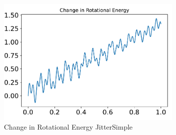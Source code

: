 \begin{figure}[htbp]\centerline{\includegraphics[width=0.80\textwidth]{AutoTeX/ChangeInRotationalEnergyJitterSimple}}\caption{Change in Rotational Energy JitterSimple}\label{fig:ChangeInRotationalEnergyJitterSimple}\end{figure}